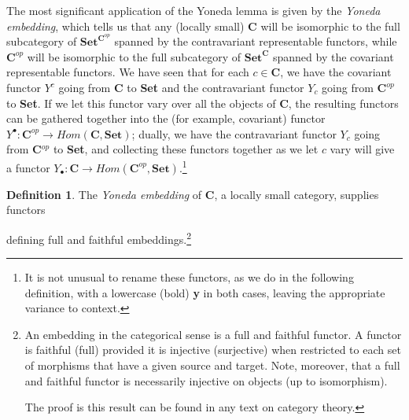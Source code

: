 \documentclass[a4paper]{book}
\theoremstyle{definition}
\theoremstyle{definition}
\newtheorem{definition}{Definition}[section]
\theoremstyle{definition}
\theoremstyle{theorem}
\theoremstyle{definition}
\begin{document}
\begin{center}  
\end{center} 
The most significant application of the Yoneda lemma is given by the \textit{Yoneda embedding}, which tells us that any (locally small) \textbf{C} will be isomorphic to the full subcategory of $\textbf{Set}^{\textbf{C}^{op}}$ spanned by the contravariant representable functors, while $\textbf{C}^{op}$ will be isomorphic to the full subcategory of $\textbf{Set}^{\textbf{C}}$ spanned by the covariant representable functors. We have seen that for each $c \in \textbf{C}$, we have the covariant functor $Y^c$ going from \textbf{C} to \textbf{Set} and the contravariant functor $Y_c$ going from $\textbf{C}^{op}$ to \textbf{Set}. If we let this functor vary over all the objects of \textbf{C}, the resulting functors can be gathered together into the (for example, covariant) functor $Y^{\bullet}: \textbf{C}^{op} \rightarrow Hom(\textbf{C}, \textbf{Set})$; dually, we have the contravariant functor $Y_c$ going from \textbf{C}$^{op}$ to \textbf{Set}, and collecting these functors together as we let $c$ vary will give a functor $Y_{\bullet}: \textbf{C} \rightarrow Hom(\textbf{C}^{op}, \textbf{Set})$.\footnote{It is not unusual to rename these functors, as we do in the following definition, with a lowercase (bold) \textbf{y} in both cases, leaving the appropriate variance to context.}
\begin{definition} The \textit{Yoneda embedding}  of \textbf{C}, a locally small category, supplies functors 
	\begin{center} 
	\end{center} 
	defining full and faithful embeddings.\footnote{An embedding in the categorical sense is a full and faithful functor. A functor is faithful (full) provided it is injective (surjective) when restricted to each set of morphisms that have a given source and target. Note, moreover, that a full and faithful functor is necessarily injective on objects (up to isomorphism). \par 
	The proof is this result can be found in any text on category theory.} 
\end{definition}
\end{document}

